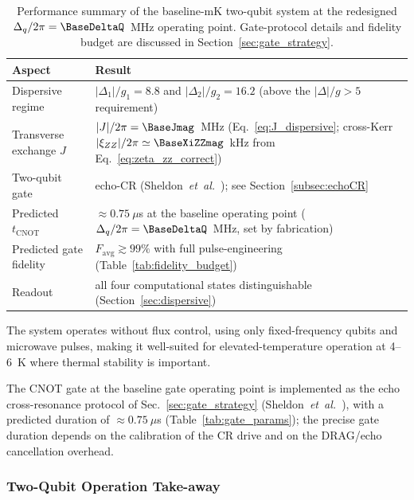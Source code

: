\begin{table}[h]
\centering
\begin{tabular}{@{}lp{}@{}}
\toprule
\textbf{Aspect} & \textbf{Result} \\
\midrule
Dispersive regime         & $|\Delta_1|/g_1 = 8.8$ and $|\Delta_2|/g_2 = 16.2$ (above the $|\Delta|/g > 5$ requirement) \\
Transverse exchange $J$   & $|J|/2\pi = \BaseJmag$~MHz (Eq.~\eqref{eq:J_dispersive}; cross-Kerr $|\xi_{ZZ}|/2\pi \simeq \BaseXiZZmag$~kHz from Eq.~\eqref{eq:zeta_zz_correct}) \\
Two-qubit gate            & echo-CR (Sheldon~\textit{et~al.}~\cite{Sheldon2016}); see Section~\ref{subsec:echoCR} \\
Predicted $t_{\mathrm{CNOT}}$ & $\approx 0.75~\mu$s at the baseline operating point ($\Delta_q/2\pi = \BaseDeltaQ$~MHz, set by fabrication) \\
Predicted gate fidelity   & $F_{\mathrm{avg}} \gtrsim 99\%$ with full pulse-engineering (Table~\ref{tab:fidelity_budget}) \\
Readout                   & all four computational states distinguishable (Section~\ref{sec:dispersive}) \\
\bottomrule
\end{tabular}
\caption{Performance summary of the baseline-mK two-qubit system at the redesigned
$\Delta_q/2\pi = \BaseDeltaQ$~MHz operating point. Gate-protocol details and fidelity budget
are discussed in Section~\ref{sec:gate_strategy}.}
\label{tab:performance_summary_baseline}
\end{table}

The system operates without flux control, using only fixed-frequency qubits and microwave pulses, making it well-suited for elevated-temperature operation at 4--6~K where thermal stability is important.

The CNOT gate at the baseline gate operating point is implemented as the echo
cross-resonance protocol of Sec.~\ref{sec:gate_strategy}
(Sheldon~\textit{et~al.}~\cite{Sheldon2016}), with a predicted duration of
$\approx 0.75~\mu$s (Table~\ref{tab:gate_params}); the precise gate duration
depends on the calibration of the CR drive and on the DRAG/echo cancellation
overhead.

\subsubsection{Two-Qubit Operation Take-away}

